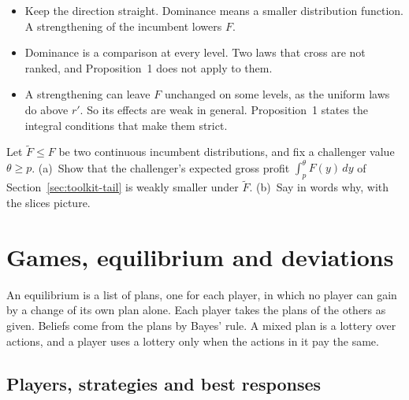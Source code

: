 \begin{watchout}
\begin{itemize}
\item Keep the direction straight. Dominance means a smaller distribution function. A strengthening of the
incumbent lowers \(F\).
\item Dominance is a comparison at every level. Two laws that cross are not ranked, and Proposition~1 does not
apply to them.
\item A strengthening can leave \(F\) unchanged on some levels, as the uniform laws do above \(r'\). So its effects
are weak in general. Proposition~1 states the integral conditions that make them strict.
\end{itemize}
\end{watchout}

\begin{checkyourself}\label{q:toolkit-fosd}
Let \(\tilde F\le F\) be two continuous incumbent distributions, and fix a challenger value \(\theta\ge p\).
(a)~Show that the challenger's expected gross profit \(\int_p^\theta F(y)\,dy\) of
Section~\ref{sec:toolkit-tail} is weakly smaller under \(\tilde F\).
(b)~Say in words why, with the slices picture.
\end{checkyourself}

\section{Games, equilibrium and deviations}\label{sec:toolkit-games}

\begin{intuition}
An equilibrium is a list of plans, one for each player, in which no player can gain by a change of its own plan
alone. Each player takes the plans of the others as given. Beliefs come from the plans by Bayes' rule. A mixed plan
is a lottery over actions, and a player uses a lottery only when the actions in it pay the same.
\end{intuition}

\subsection{Players, strategies and best responses}

